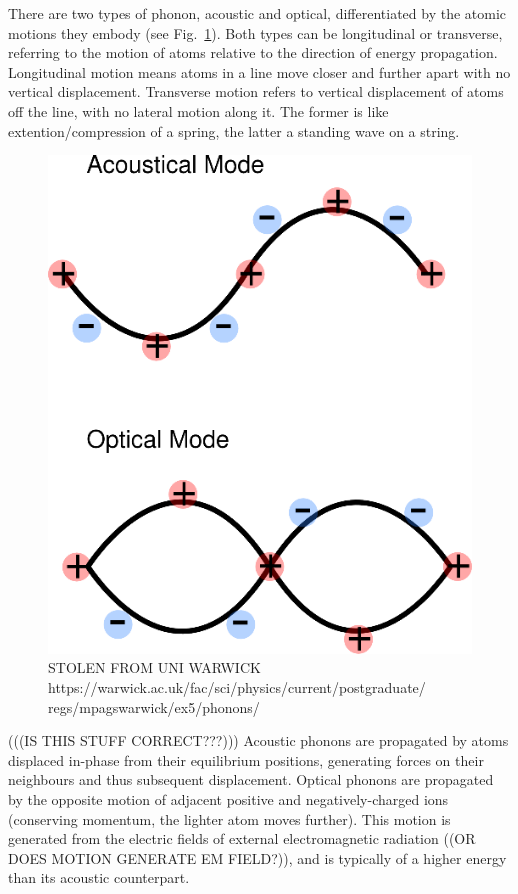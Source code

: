 There are two types of phonon, acoustic and optical, differentiated by the atomic motions they embody (see Fig.~\ref{fig:phonon_diagram}). Both types can be longitudinal or transverse, referring to the motion of atoms relative to the direction of energy propagation. Longitudinal motion means atoms in a line move closer and further apart with no vertical displacement. Transverse motion refers to vertical displacement of atoms off the line, with no lateral motion along it. The former is like extention/compression of a spring, the latter a standing wave on a string.
 
\begin{figure}[h]
  \includegraphics[width=\linewidth]{Figures/phonon-warwick-acoustic-optical-diagram.png}
  \caption[PHONON TYPE DIAGRAM]{STOLEN FROM UNI WARWICK https://warwick.ac.uk/fac/sci/physics/current/postgraduate/
  regs/mpagswarwick/ex5/phonons/}
  \label{fig:phonon_diagram}
\end{figure}

(((IS THIS STUFF CORRECT???))) Acoustic phonons are propagated by atoms displaced in-phase from their equilibrium positions, generating forces on their neighbours and thus subsequent displacement. Optical phonons are propagated by the opposite motion of adjacent positive and negatively-charged ions (conserving momentum, the lighter atom moves further). This motion is generated from the electric fields of external electromagnetic radiation ((OR DOES MOTION GENERATE EM FIELD?)), and is typically of a higher energy than its acoustic counterpart. 

